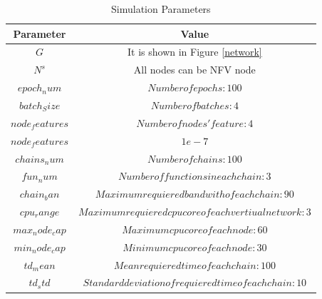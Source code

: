 \documentclass[12pt]{article}
\begin{document}
\begin{table}[t!]
\centering
\begin{tabular}{|c c|} 
 \hline
 Parameter & Value \\ [0.5ex] 
 \hline 
 $G$ &It is shown in Figure \ref{network}\\ 
 $N^s$ & All nodes can be NFV node  \\
 $ epoch_num$ &  $Number of epochs: 100$ \\
 $batch_Size$ & $Number of batches: 4$ \\
 $node_features$& $Number of nodes' feature: 4$ \\
 $node_features$ & $1e-7$\\
 $chains_num$ & $Number of chains: 100$\\
 $fun_num$ & $ Number of functions in each chain: 3$\\
 $chain_ban$& $Maximum requiered bandwith of each chain: 90$ \\
 $cpu_range$& $Maximum requiered cpu core of each vertiual network: 3$\\
 $max_node_cap$& $Maximum cpu core of each node: 60$\\
 $min_node_cap$&$Minimum cpu core of each node: 30$\\
 $td_mean$& $Mean requiered time of each chain: 100$\\
 $td_std$& $Standard deviation of requiered time of each chain: 10$\\
 \hline
\end{tabular}
\caption{Simulation Parameters}
\label{table:5}
\end{table}
\end{document}
